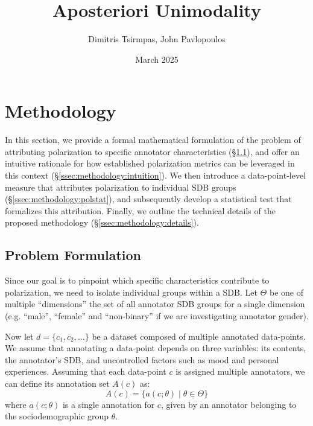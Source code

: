\documentclass{article}
\title{Aposteriori Unimodality}
\author{Dimitris Tsirmpas, John Pavlopoulos}
\date{March 2025}
\begin{document}
\maketitle

\section{Methodology}
\label{sec:methodology}

In this section, we provide a formal mathematical formulation of the problem of attributing polarization to specific annotator characteristics (\S\ref{ssec:methodology:problem}), and offer an intuitive rationale for how established polarization metrics can be leveraged in this context (\S\ref{ssec:methodology:intuition}). We then introduce a data-point-level measure that attributes polarization to individual \ac{SDB} groups (\S\ref{ssec:methodology:polstat}), and subsequently develop a statistical test that formalizes this attribution. Finally, we outline the technical details of the proposed methodology (\S\ref{ssec:methodology:details}).


\subsection{Problem Formulation}
\label{ssec:methodology:problem}

Since our goal is to pinpoint which specific characteristics contribute to polarization, we need to isolate individual groups within a \ac{SDB}. Let $\Theta$ be one of multiple ``dimensions'' the set of all annotator \ac{SDB} groups for a single dimension (e.g. ``male'', ``female'' and ``non-binary'' if we are investigating annotator gender).

Now let $d = \{c_1, c_2, \ldots\}$ be a dataset composed of multiple annotated data-points. We assume that annotating a data-point depends on three variables: its contents, the annotator's \ac{SDB}, and uncontrolled factors such as mood and personal experiences. Assuming that each data-point $c$ is assigned multiple annotators, we can define its annotation set $A(c)$ as:
\begin{equation}
    A(c) = \{a(c; \theta) \mid \theta \in \Theta \}
\end{equation}
\noindent where  $a(c; \theta)$ is a single annotation for $c$, given by an annotator belonging to the sociodemographic group $\theta$.
\end{document}
